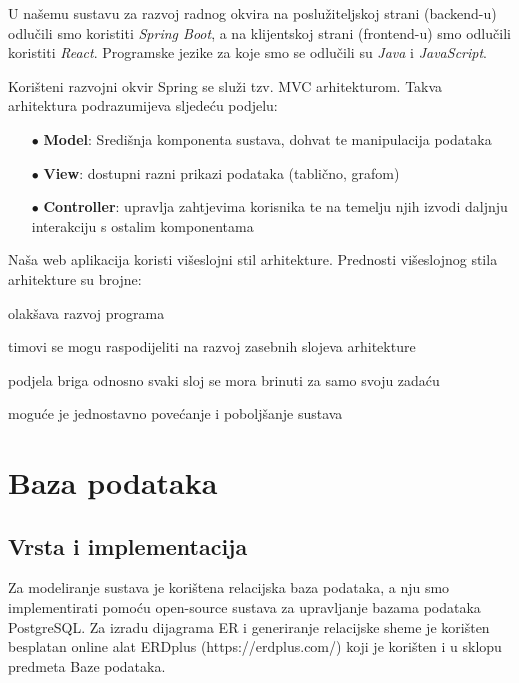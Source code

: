 U našemu sustavu za razvoj radnog okvira na poslužiteljskoj strani (backend-u) odlučili smo koristiti \textit {Spring Boot}, a na klijentskoj strani (frontend-u) smo odlučili koristiti \textit {React}. Programske jezike za koje smo se odlučili su \textit {Java} i \textit {JavaScript}.


Korišteni razvojni okvir Spring se služi tzv. MVC arhitekturom. Takva arhitektura podrazumijeva sljedeću podjelu:
\begin{itemize}
	\item[$\bullet$] \textbf{Model}: Središnja komponenta sustava, dohvat te manipulacija podataka
	\item[$\bullet$] \textbf{View}: dostupni razni prikazi podataka (tablično, grafom)
	\item[$\bullet$] \textbf{Controller}: upravlja zahtjevima korisnika te na temelju njih izvodi daljnju interakciju s ostalim komponentama
\end{itemize}

\vspace{3cm}

Naša web aplikacija koristi višeslojni stil arhitekture. Prednosti višeslojnog stila arhitekture su brojne:

\begin{packed_item}
	\item[$\bullet$] olakšava razvoj programa
	\item[$\bullet$] timovi se mogu raspodijeliti na razvoj zasebnih slojeva arhitekture
	\item[$\bullet$] podjela briga odnosno svaki sloj se mora brinuti za samo svoju zadaću
	\item[$\bullet$] moguće je jednostavno povećanje i poboljšanje sustava
\end{packed_item}







\section{Baza podataka}




\subsection{Vrsta i implementacija}
Za modeliranje sustava je korištena relacijska baza podataka, a nju smo implementirati pomoću open-source sustava za upravljanje bazama podataka PostgreSQL. Za izradu dijagrama ER i generiranje relacijske sheme je korišten besplatan online alat ERDplus (https://erdplus.com/) koji je korišten i u sklopu predmeta Baze podataka. 



